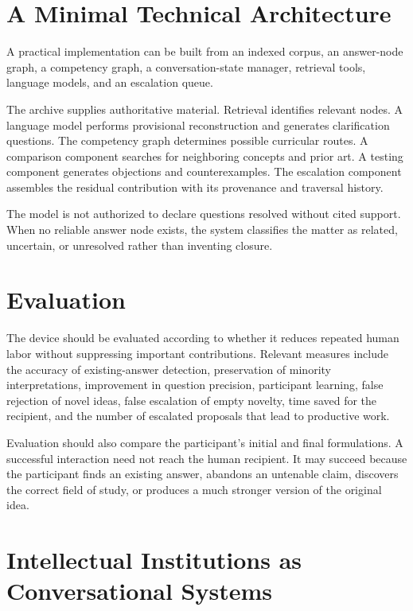 \documentclass[11pt]{article}
\begin{document}
\section{A Minimal Technical Architecture}

A practical implementation can be built from an indexed corpus, an answer-node graph, a competency graph, a conversation-state manager, retrieval tools, language models, and an escalation queue.

The archive supplies authoritative material. Retrieval identifies relevant nodes. A language model performs provisional reconstruction and generates clarification questions. The competency graph determines possible curricular routes. A comparison component searches for neighboring concepts and prior art. A testing component generates objections and counterexamples. The escalation component assembles the residual contribution with its provenance and traversal history.

The model is not authorized to declare questions resolved without cited support. When no reliable answer node exists, the system classifies the matter as related, uncertain, or unresolved rather than inventing closure.

\section{Evaluation}

The device should be evaluated according to whether it reduces repeated human labor without suppressing important contributions. Relevant measures include the accuracy of existing-answer detection, preservation of minority interpretations, improvement in question precision, participant learning, false rejection of novel ideas, false escalation of empty novelty, time saved for the recipient, and the number of escalated proposals that lead to productive work.

Evaluation should also compare the participant's initial and final formulations. A successful interaction need not reach the human recipient. It may succeed because the participant finds an existing answer, abandons an untenable claim, discovers the correct field of study, or produces a much stronger version of the original idea.

\section{Intellectual Institutions as Conversational Systems}
\end{document}
